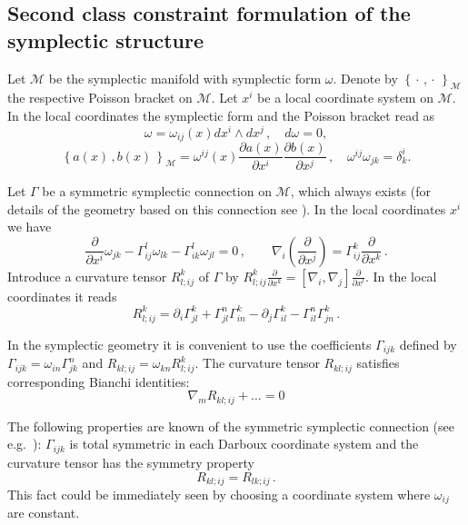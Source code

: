 \documentclass[a4paper,11pt,oneside]{amsart}
\theoremstyle{plain}
\numberwithin{equation}{section} %
\numberwithin{figure}{section} %
\newcommand{\pb}[2]{\left\{{}#1{},{}#2{}\right\}}
\def\d{\partial}
\newcommand{\dl}[1]{\displaystyle\frac{{\d}}{\d #1}}
\def\manM{{\mathcal M}}
\begin{document}
\subsection{Second class constraint formulation of the
symplectic structure}\label{subsec:FM}
Let $\manM$ be the symplectic manifold with symplectic form $\omega$.
Denote by $\pb{\cdot \,}{\cdot \,}_\manM $ the respective
Poisson bracket on $\manM$.  Let $x^i$ be a local coordinate
system on $\manM$.  In the local coordinates
the symplectic form and the Poisson bracket read as
\begin{equation}
\omega=\omega_{ij}(x)d x^i\wedge d x^j \,, \quad d \omega =0 ,
\label{formM}
\end{equation}
\begin{equation}
\pb{a(x)\,}{b(x)\,}_\manM=
\omega^{ij}(x)\frac{\d a(x)}{\d x^i}\frac{\d b(x) }{\d x^j}\,,\quad
\omega^{ij}\omega_{jk}=\delta^i_k.
\label{PBM}
\end{equation}

\noindent
Let $\Gamma$ be a symmetric symplectic connection on $\manM$,
which always exists (for details of the geometry based on this
connection see \cite{[GRS]}).
In the local coordinates $x^i$ we have
\begin{equation}
\label{eq:coefficients}
\dl{x^i}\omega_{jk}-\Gamma^l_{ij}\omega_{lk}-\Gamma^l_{ik}\omega_{jl}=0\,,
\qquad \nabla_i(\dl{x^j})=\Gamma^k_{ij}\dl{x^k}\,.
\end{equation}
Introduce a curvature tensor $R^k_{l;ij}$ of $\Gamma$ by
$R^k_{l;ij}\dl{x^k}=[\nabla_i,\nabla_j]\dl{x^l}$.
In the local coordinates it reads
\begin{equation}
  \label{eq:riemann}
R^k_{l;ij}=\d_i\Gamma^k_{jl}+\Gamma^n_{jl}\Gamma^k_{in}-
\d_j\Gamma^k_{il}-\Gamma^n_{il}\Gamma^k_{jn}\,.
\end{equation}

\noindent
In the symplectic geometry it is convenient to use the coefficients
$\Gamma_{ijk}$ defined by $\Gamma_{ijk}=\omega_{in}\Gamma^n_{jk}$
and $R_{kl;ij}=\omega_{kn}R^k_{l;ij}$.  The curvature
tensor $R_{kl;ij}$ satisfies corresponding Bianchi
identities:
\begin{equation}
\label{Bianchi}
\nabla_m R_{kl;ij} + \ldots = 0
\end{equation}


\noindent
The following properties are known of the symmetric symplectic
connection (see e.g.~\cite{[GRS]}): $\Gamma_{ijk}$ is total symmetric
in each Darboux coordinate system and the curvature tensor has the symmetry
property
\begin{equation}
        R_{kl;ij}=R_{lk;ij}\,.
\end{equation}
This fact could be immediately seen by choosing a coordinate system
where $\omega_{ij}$ are constant.
\end{document}
